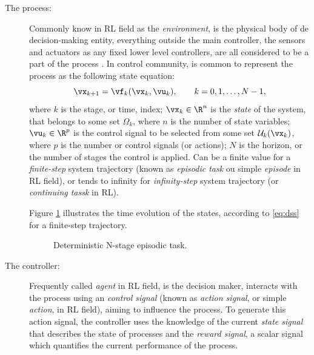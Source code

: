\begin{description}
    \item[The process:] 
      Commonly know in RL field as the \emph{environment},  is the physical body of de decision-making entity, everything outside the main controller,  the sensors and actuators as any fixed lower level controllers, are all considered to be a part of the process \citep{busoniu2017}. 
      In control community, is common to represent the process as the following state equation:
      \begin{equation}
          \vx_{k+1} = \vf_k(\vx_k,\vu_k), \qquad k = 0, 1, \dots, N-1
      \label{eq:dss},
      \end{equation}
      where $k$ is the stage, or time, index; $\vx_k \in \R^n$ is the \emph{state} of the system, that belongs to some set $\Omega_k$, where $n$ is the number of state variables; $\vu_k \in \R^p$ is the control signal to be selected from some set $\mathcal{U}_k(\vx_k)$, where $p$ is the number or control signals (or actions); $N$ is the horizon, or the number of stages the control is applied. Can be a finite value for a \emph{finite-step} system trajectory (known as \emph{episodic task} ou simple \emph{episode} in RL field), or tends to infinity for \emph{infinity-step} system trajectory (or \emph{continuing tassk} in RL).

      Figure \ref{fig:stages} illustrates the time evolution of the states, according to \eqref{eq:dss} for a finite-step trajectory.

      \begin{figure}[htpb]
          \centering
          
          \caption{Deterministic N-stage episodic task.}
          \label{fig:stages}
      \end{figure} 

    \item[The controller:] Frequently called \emph{agent}  in RL field, is the decision maker, interacts with the process using an \textit{control signal} (known as  \emph{action signal}, or simple \emph{action}, in RL field), aiming to influence the process. To generate this action signal, the controller uses the knowledge of the current \textit{state signal} that describes the state of processes and the \textit{reward signal}, a scalar signal which quantifies the current performance of the process.


\end{description}
